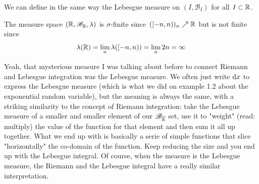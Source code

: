 \documentclass{report}
\begin{document}
\begin{revise}
\begin{flushright}
\begin{tikzpicture}
	\end{tikzpicture}\hspace*{1.5cm}
\end{flushright}
\hspace{2cm}
\begin{remark}
	We can define in the same way the Lebesgue measure on $(I, \mathscr{B}_I)$ for all $I\subset\R$.
\end{remark}
\begin{remark}
	The measure space $(\R,\mathscr{B}_\R,\lambda)$ is $\sigma$-finite since $([-n,n))_n\nearrow\R$ but is not finite since
	\[ \lambda(\R)=\lim_{n}\lambda([-n,n))=\lim_{n}2n=\infty\]
\end{remark}
\end{revise}
Yeah, that mysterious measure I was talking about before to connect Riemann and Lebesgue integration was the Lebesgue measure. We often just write $\dx$ to express the Lebesgue measure (which is what we did on example 1.2 about the exponential random variable), but the meaning is always the same, with a striking similarity to the concept of Riemann integration: take the Lebesgue measure of a smaller and smaller element of our $\B_{\overline{\R}}$ set, use it to "weight" (read: multiply) the value of the function for that element and then  sum it all up together. What we end up with is basically a serie of simple functions that slice "horizontally" the co-domain of the function. Keep reducing the size and you end up with the Lebesgue integral. Of course, when the measure is the Lebesgue measure, the Riemann and the Lebesgue integral have a really similar interpretation.\par
\end{document}
